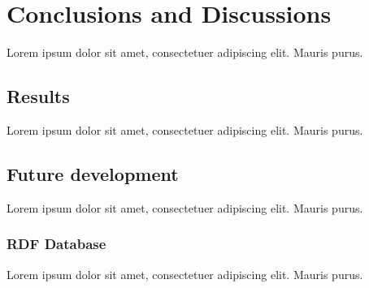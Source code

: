 \chapter{Conclusions and Discussions}

Lorem ipsum dolor sit amet, consectetuer adipiscing elit. Mauris
purus. 

\section{Results}

Lorem ipsum dolor sit amet, consectetuer adipiscing elit. Mauris
purus. 

\section{Future development}

Lorem ipsum dolor sit amet, consectetuer adipiscing elit. Mauris
purus. 

\subsection{RDF Database}

Lorem ipsum dolor sit amet, consectetuer adipiscing elit. Mauris
purus. 